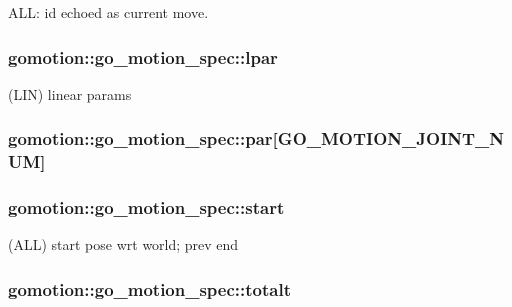 A\-L\-L\-: id echoed as current move. 

\hypertarget{structgomotion_1_1go__motion__spec_a25d35e4638e0dd5721409d02e2f48445}{
\subsubsection[{lpar}]{ gomotion\-::go\-\_\-motion\-\_\-spec\-::lpar}}\label{structgomotion_1_1go__motion__spec_a25d35e4638e0dd5721409d02e2f48445}


(L\-I\-N) linear params 

\hypertarget{structgomotion_1_1go__motion__spec_a71e60787cb50243693e8588918b8fe29}{
\subsubsection[{par}]{ gomotion\-::go\-\_\-motion\-\_\-spec\-::par\mbox{[}{\bf G\-O\-\_\-\-M\-O\-T\-I\-O\-N\-\_\-\-J\-O\-I\-N\-T\-\_\-\-N\-U\-M}\mbox{]}}}\label{structgomotion_1_1go__motion__spec_a71e60787cb50243693e8588918b8fe29}
\hypertarget{structgomotion_1_1go__motion__spec_a87e745675e617e11ea1783a6ea80afa0}{
\subsubsection[{start}]{ gomotion\-::go\-\_\-motion\-\_\-spec\-::start}}\label{structgomotion_1_1go__motion__spec_a87e745675e617e11ea1783a6ea80afa0}


(A\-L\-L) start pose wrt world; prev end 

\hypertarget{structgomotion_1_1go__motion__spec_abf6e879f2b06d62fe0bec48b9d723186}{
\subsubsection[{totalt}]{ gomotion\-::go\-\_\-motion\-\_\-spec\-::totalt}}\label{structgomotion_1_1go__motion__spec_abf6e879f2b06d62fe0bec48b9d723186}


